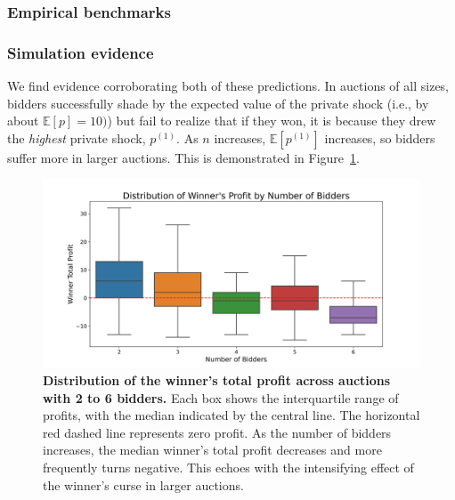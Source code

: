 \documentclass{article} %
\begin{document}
\subsubsection{Empirical benchmarks}

\subsubsection{Simulation evidence}
We find evidence corroborating both of these predictions. 
In auctions of all sizes, bidders successfully shade by the expected value of the private shock (i.e., by about $\mathbb{E}[p] = 10)$) but fail to realize that if they won, it is because they drew the \textit{highest} private shock, $p^{(1)}$. 
As $n$ increases, $\mathbb{E}[p^{(1)}]$ increases, so bidders suffer more in larger auctions. 
This is demonstrated in Figure~\ref{fig:winner}. 

\begin{figure}[h]  %
    
    \centering  %
    \includegraphics[width=\linewidth]{Figs/cv_plot.png}  %
    \caption{\textbf{Distribution of the winner’s total profit across auctions with 2 to 6 bidders.} Each box shows the interquartile range of profits, with the median indicated by the central line. The horizontal red dashed line represents zero profit. As the number of bidders increases, the median winner's total profit decreases and more frequently turns negative. This echoes with the intensifying effect of the winner's curse in larger auctions.}
    \label{fig:winner}

\end{figure}
\end{document}
